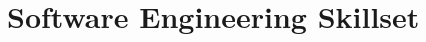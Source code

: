\documentclass[11pt,a4paper,sans]{moderncv}        %
\begin{document}
    \section{Software Engineering Skillset}



%
%
%
\end{document}
